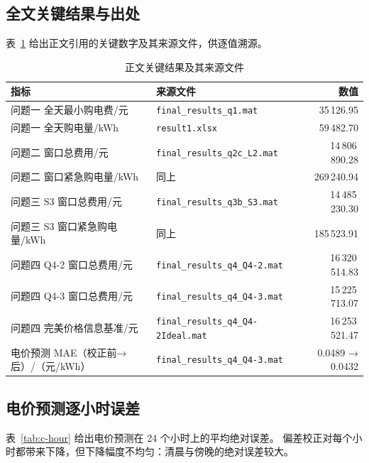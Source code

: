\subsection{全文关键结果与出处}

表~\ref{tab:c-index} 给出正文引用的关键数字及其来源文件，供逐值溯源。

\begin{table}[H]
\centering
{}
\begin{tabular}{llr}
\toprule
指标 & 来源文件 & 数值 \\
\midrule
问题一 全天最小购电费/元 & \texttt{final\_results\_q1.mat} & 35\,126.95 \\
问题一 全天购电量/kWh & \texttt{result1.xlsx} & 59\,482.70 \\
问题二 窗口总费用/元 & \texttt{final\_results\_q2c\_L2.mat} & 14\,806\,890.28 \\
问题二 窗口紧急购电量/kWh & 同上 & 269\,240.94 \\
问题三 S3 窗口总费用/元 & \texttt{final\_results\_q3b\_S3.mat} & 14\,485\,230.30 \\
问题三 S3 窗口紧急购电量/kWh & 同上 & 185\,523.91 \\
问题四 Q4-2 窗口总费用/元 & \texttt{final\_results\_q4\_Q4-2.mat} & 16\,320\,514.83 \\
问题四 Q4-3 窗口总费用/元 & \texttt{final\_results\_q4\_Q4-3.mat} & 15\,225\,713.07 \\
问题四 完美价格信息基准/元 & \texttt{final\_results\_q4\_Q4-2Ideal.mat} & 16\,253\,521.47 \\
电价预测 MAE（校正前→后）/（元/kWh） & \texttt{final\_results\_q4\_Q4-3.mat} & 0.0489 → 0.0432 \\
\bottomrule
\end{tabular}
\caption{正文关键结果及其来源文件}
\label{tab:c-index}
\end{table}

\subsection{电价预测逐小时误差}

表~\ref{tab:c-hour} 给出电价预测在 24 个小时上的平均绝对误差。
偏差校正对每个小时都带来下降，但下降幅度不均匀：清晨与傍晚的绝对误差较大。


